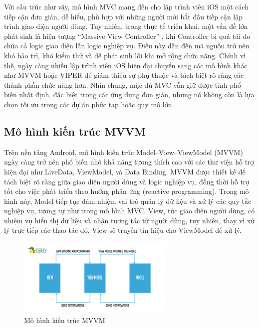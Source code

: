     \begin{flushleft}
      \hspace*{0.8cm}Với cấu trúc như vậy, mô hình MVC mang đến cho lập trình viên iOS một cách tiếp cận đơn giản, dễ hiểu, phù hợp với những người mới bắt đầu tiếp cận lập trình giao diện người dùng. Tuy nhiên, trong thực tế triển khai, một vấn đề lớn phát sinh là hiện tượng “Massive View Controller” \cite{massive_vc}, khi Controller bị quá tải do chứa cả logic giao diện lẫn logic nghiệp vụ. Điều này dẫn đến mã nguồn trở nên khó bảo trì, khó kiểm thử và dễ phát sinh lỗi khi mở rộng chức năng. Chính vì thế, ngày càng nhiều lập trình viên iOS hiện đại chuyển sang các mô hình khác như MVVM hoặc VIPER để giảm thiểu sự phụ thuộc và tách biệt rõ ràng các thành phần chức năng hơn. Nhìn chung, mặc dù MVC vẫn giữ được tính phổ biến nhất định, đặc biệt trong các ứng dụng đơn giản, nhưng nó không còn là lựa chọn tối ưu trong các dự án phức tạp hoặc quy mô lớn.
    \end{flushleft}

\subsection{Mô hình kiến trúc MVVM}
\renewcommand{\labelitemi}{--}    
    \begin{flushleft}
        \hspace*{0.8cm}Trên nền tảng Android, mô hình kiến trúc Model–View–ViewModel (MVVM) ngày càng trở nên phổ biến nhờ khả năng tương thích cao với các thư viện hỗ trợ hiện đại như LiveData, ViewModel, và Data Binding. MVVM được thiết kế để tách biệt rõ ràng giữa giao diện người dùng và logic nghiệp vụ, đồng thời hỗ trợ tốt cho việc phát triển theo hướng phản ứng (reactive programming). Trong mô hình này, Model tiếp tục đảm nhiệm vai trò quản lý dữ liệu và xử lý các quy tắc nghiệp vụ, tương tự như trong mô hình MVC. View, tức giao diện người dùng, có nhiệm vụ hiển thị dữ liệu và nhận tương tác từ người dùng, tuy nhiên, thay vì xử lý trực tiếp các thao tác đó, View sẽ truyền tín hiệu cho ViewModel để xử lý.
    \end{flushleft}

\begin{figure}[h]
    \centering
    \includegraphics[width=0.67\textwidth]{images/mvvm.jpg}
    \caption{Mô hình kiến trúc MVVM}
    \label{fig:fig13}
  \end{figure}

